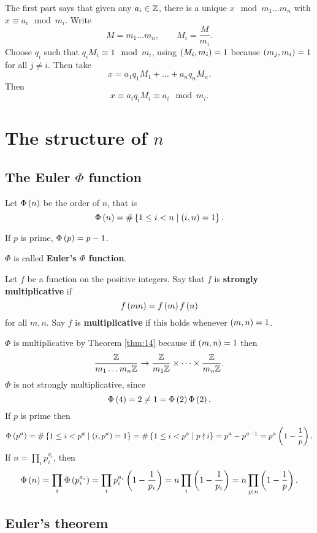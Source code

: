 The first part says that given any $ a_i \in \mathbb{Z} $, there is a unique $ x \mod m_1 \dots m_n $ with $ x \equiv a_i \mod m_i $. Write
$$ M = m_1 \dots m_n, \qquad M_i = \dfrac{M}{m_i}. $$
Choose $ q_i $ such that $ q_iM_i \equiv 1 \mod m_i $, using $ \left( M_i, m_i \right) = 1 $ because $ \left( m_j, m_i \right) = 1 $ for all $ j \ne i $. Then take
$$ x = a_1q_1M_1 + \dots + a_nq_nM_n. $$
Then
$$ x \equiv a_iq_iM_i \equiv a_i \mod m_i. $$

\pagebreak

\section{The structure of $ \unit{n} $}

\subsection{The Euler $ \Phi $ function}

Let $ \Phi\left( n \right) $ be the order of $ \unit{n} $, that is
$$ \Phi\left( n \right) = \#\left\{ 1 \le i < n \mid \left( i, n \right) = 1 \right\}. $$

\begin{example2}
If $ p $ is prime, $ \Phi\left( p \right) = p - 1 $.
\end{example2}

$ \Phi $ is called \textbf{Euler's $ \Phi $ function}.

\begin{definition}
Let $ f $ be a function on the positive integers. Say that $ f $ is \textbf{strongly multiplicative} if
$$ f\left( mn \right) = f\left( m \right)f\left( n \right) $$
for all $ m, n $. Say $ f $ is \textbf{multiplicative} if this holds whenever $ \left( m, n \right) = 1 $.
\end{definition}
  
$ \Phi $ is multiplicative by Theorem \ref{thm:14} because if $ \left( m, n \right) = 1 $ then
$$ \dfrac{\mathbb{Z}}{m_1 \dots m_n\mathbb{Z}} \to \dfrac{\mathbb{Z}}{m_1\mathbb{Z}} \times \dots \times \dfrac{\mathbb{Z}}{m_n\mathbb{Z}}. $$
$ \Phi $ is not strongly multiplicative, since
$$ \Phi\left( 4 \right) = 2 \ne 1 = \Phi\left( 2 \right)\Phi\left( 2 \right). $$
If $ p $ is prime then
$$ \Phi\left( p^a \right) = \#\left\{ 1 \le i < p^a \mid \left( i, p^a \right) = 1 \right\} = \#\left\{ 1 \le i < p^a \mid p \nmid i \right\} = p^a - p^{a - 1} = p^a\left( 1 - \dfrac{1}{p} \right). $$
If $ n = \prod_i p_i^{a_i} $, then
$$ \Phi\left( n \right) = \prod_i \Phi\left( p_i^{a_i} \right) = \prod_i p_i^{a_i}\left( 1 - \dfrac{1}{p_i} \right) = n\prod_i \left( 1 - \dfrac{1}{p_i} \right) = n\prod_{p \mid n} \left( 1 - \dfrac{1}{p} \right). $$

\subsection{Euler's theorem}


